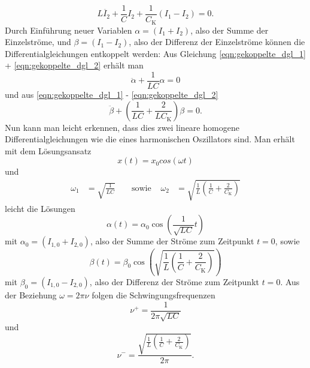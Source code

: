 \begin{equation}
  L \ddot{I_2} + \frac{1}{C} I_2 + \frac{1}{C_\text{K}} (I_1 - I_2) = 0.
  \label{eqn:gekoppelte_dgl_2}
\end{equation}
Durch Einführung neuer Variablen $\alpha = (I_1 + I_2)$, also der Summe der
Einzelströme, und $\beta = (I_1 - I_2)$, also der Differenz der Einzelströme
können die Differentialgleichungen entkoppelt werden:
Aus Gleichung \eqref{eqn:gekoppelte_dgl_1} + \eqref{eqn:gekoppelte_dgl_2} erhält
man
\begin{equation}
  \ddot{\alpha} + \frac{1}{L C} \alpha = 0
  \label{eqn:dgl1}
\end{equation}
und aus \eqref{eqn:gekoppelte_dgl_1} - \eqref{eqn:gekoppelte_dgl_2}
\begin{equation}
  \ddot{\beta} + \left(\frac{1}{L C} + \frac{2}{L C_\text{K}}\right) \beta = 0.
  \label{eqn:dgl2}
\end{equation}
Nun kann man leicht erkennen, dass dies zwei lineare homogene Differentialgleichungen
wie die eines harmonischen Oszillators sind. Man erhält mit dem Lösungsansatz
\begin{equation}
  x(t) = x_0 cos (\omega t)
\end{equation}
und
\begin{align*}
  \omega_1 &= \sqrt{\frac{1}{LC}} & &\text{ sowie } &
  \omega_2 &= \sqrt{\frac{1}{L}\left(\frac{1}{C}+\frac{2}{C_\text{K}}\right)}
\end{align*}
leicht die Lösungen
\begin{equation}
  \alpha(t) = \alpha_0 \cos\left(\frac{1}{\sqrt{L C}}t\right)
  \label{eqn:alpha}
\end{equation}
mit $\alpha_0 = (I_{1,0} + I_{2,0})$, also der Summe der Ströme zum Zeitpunkt
$t = 0$, sowie
\begin{equation}
  \beta(t) = \beta_0 \cos\left(\sqrt{\frac{1}{L}\left(\frac{1}{C}+
  \frac{2}{C_\text{K}}\right)}\right)
\end{equation}
mit $\beta_0 = (I_{1,0} - I_{2,0})$, also der Differenz der Ströme zum Zeitpunkt
$t = 0$.
Aus der Beziehung $\omega = 2 \pi \nu$ folgen die Schwingungsfrequenzen
\begin{equation}
  \nu^{+} = \frac{1}{2 \pi \sqrt{L C}}
  \label{eqn:frequenz_puls}
\end{equation}
und
\begin{equation}
  \nu^{-} = \frac{\sqrt{\frac{1}{L}\left(\frac{1}{C}+\frac{2}{C_\text{K}}\right)}}{2 \pi}.
  \label{eqn:frequenz_minus}
\end{equation}

